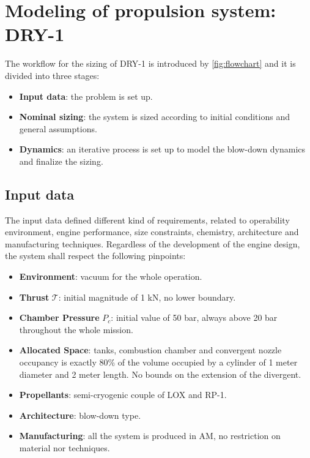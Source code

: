\section{Modeling of propulsion system: DRY-1}
\label{sec:modeling}

\pagebreak
The workflow for the sizing of DRY-1 is introduced by \autoref{fig:flowchart} and it is divided into three stages:
\begin{itemize}
    \item \textbf{Input data}:  the problem is set up. 
    \item \textbf{Nominal sizing}: the system is sized according to initial conditions and general assumptions.
    \item \textbf{Dynamics}: an iterative process is set up to model the blow-down dynamics and finalize the sizing.
\end{itemize}


\subsection{Input data}
\label{subsec:input}
The input data defined different kind of requirements, related to operability environment, engine performance, size constraints, chemistry, architecture and manufacturing techniques. Regardless of the development of the engine design, the system shall respect the following pinpoints:
\begin{itemize}
    \item \textbf{Environment}: vacuum for the whole operation.
    \item \textbf{Thrust} $\mathcal{T}$: initial magnitude of 1 kN, no lower boundary.
    \item \textbf{Chamber Pressure}  $P_c$: initial value of 50 bar, always above 20 bar throughout the whole mission.
    \item \textbf{Allocated Space}: tanks, combustion chamber and convergent nozzle occupancy is exactly 80\% of the volume occupied by a cylinder of 1 meter diameter and 2 meter length. No bounds on the extension of the divergent.
    \item \textbf{Propellants}: semi-cryogenic couple of LOX and RP-1.
    \item \textbf{Architecture}: blow-down type.
    \item \textbf{Manufacturing}: all the system is produced in AM, no restriction on material nor techniques. 
\end{itemize} 

